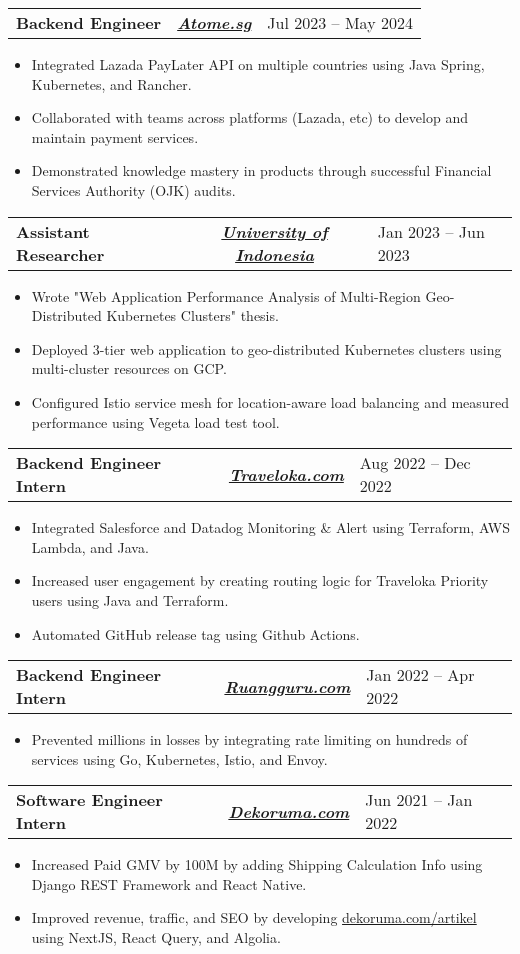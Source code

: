 \documentclass[letterpaper,11pt]{article}
\newcommand{\resumeItem}[1]{
  \item\small{
    {#1 \vspace{-3pt} }
  }
}
\newcommand{\resumeSubheading}[4]{
  \vspace{-2pt}\item

    \begin{tabularx}{\textwidth}{X c >{\raggedleft}X}

        \textbf{#1} & \textit{\textbf{#3}} & #2
    \end{tabularx}\vspace{-7pt}
}
\newcommand{\resumeItemListStart}{\begin{itemize}[leftmargin=0.15in]}
\newcommand{\resumeItemListEnd}{\end{itemize}\vspace{-5pt}}
\begin{document}
    \resumeSubheading
      {Backend Engineer} {Jul 2023 -- May 2024}
      {\href{https://www.atome.sg/}{Atome.sg}}{Jakarta, Indonesia}  
      \resumeItemListStart
        \resumeItem{Integrated Lazada PayLater API on multiple countries using Java Spring, Kubernetes, and Rancher.}
        \resumeItem{Collaborated with teams across platforms (Lazada, etc) to develop and maintain payment services.}
        \resumeItem{Demonstrated knowledge mastery in products through successful Financial Services Authority (OJK) audits.}
      \resumeItemListEnd

    \resumeSubheading
      {Assistant Researcher} {Jan 2023 -- Jun 2023}
      {\href{https://www.ui.ac.id/}{University of Indonesia}}{Jakarta, Indonesia}
      \resumeItemListStart
        \resumeItem{Wrote "Web Application Performance Analysis of Multi-Region Geo- Distributed Kubernetes Clusters" thesis.}
        \resumeItem{Deployed 3-tier web application to geo-distributed Kubernetes clusters using multi-cluster resources on GCP.}
        \resumeItem{Configured Istio service mesh for location-aware load balancing and measured performance using Vegeta load test tool.}
      \resumeItemListEnd
      
    \resumeSubheading
      {Backend Engineer Intern} {Aug 2022 -- Dec 2022}
      {\href{https://www.traveloka.com/}{Traveloka.com}}{Jakarta, Indonesia}
      \resumeItemListStart
        \resumeItem{Integrated Salesforce and Datadog Monitoring \& Alert using Terraform, AWS Lambda, and Java.}
        \resumeItem{Increased user engagement by creating routing logic for Traveloka Priority users using Java and Terraform.}
        \resumeItem{Automated GitHub release tag using Github Actions.}
      \resumeItemListEnd
      
    \resumeSubheading
      {Backend Engineer Intern} {Jan 2022 -- Apr 2022}
      {\href{https://www.ruangguru.com/}{Ruangguru.com}}{Jakarta, Indonesia}
      \resumeItemListStart
        \resumeItem{Prevented millions in losses by integrating rate limiting on hundreds of services using Go, Kubernetes, Istio, and Envoy.}
      \resumeItemListEnd

    \resumeSubheading
      {Software Engineer Intern} {Jun 2021 -- Jan 2022}
      {\href{https://dekoruma.com}{Dekoruma.com}}{Jakarta, Indonesia}
      \resumeItemListStart
        \resumeItem{Increased Paid GMV by 100M by adding Shipping Calculation Info using Django REST Framework and React Native.}
        \resumeItem{Improved revenue, traffic, and SEO by developing {\href{https://dekoruma.com/artikel}{dekoruma.com/artikel}} using NextJS, React Query, and Algolia.}
      \resumeItemListEnd
\end{document}
